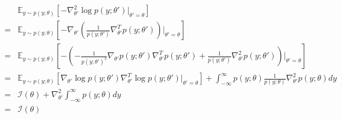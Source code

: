 \begin{answer}
\begin{align*}
&\mathbb{E}_{y\sim p(y;\theta)}[-\nabla^2_{\theta'}\log p(y;\theta')|_{\theta' = \theta}] \\
= & \mathbb{E}_{y\sim p(y;\theta)}[-\nabla_{\theta'}( \frac{1}{p(y;\theta')} \nabla_{\theta'}^T p(y;\theta'))|_{\theta' = \theta} ]\\
=& \mathbb{E}_{y\sim p(y;\theta)}[-( -\frac{1}{p(y;\theta')^2}\nabla_{\theta'}p(y;\theta')\nabla^T_{\theta'}p(y;\theta')+ \frac{1}{p(y;\theta')}\nabla^2_{\theta'} p(y;\theta'))|_{\theta' = \theta} ]\\
= &\mathbb{E}_{y\sim p(y;\theta)}[\nabla_{\theta'}\log p(y;\theta')\nabla^T_{\theta'}\log p(y;\theta')|_{\theta' = \theta}]+\int_{-\infty}^{\infty}p(y;\theta)\frac{1}{p(y;\theta)}\nabla^2_{\theta'} p(y;\theta)dy\\
= &\mathcal{I}(\theta) + \nabla^2_{\theta'}\int_{-\infty}^{\infty} p(y;\theta)dy\\
= &\mathcal{I}(\theta)
\end{align*}

\end{answer}
